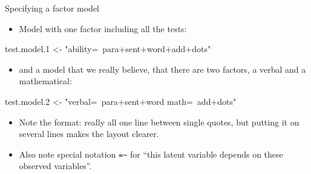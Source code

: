 \documentclass[ignorenonframetext,]{beamer}
\newenvironment{Shaded}{\begin{snugshade}}{\end{snugshade}}
\newcommand{\FloatTok}[1]{\textcolor[rgb]{0.00,0.00,0.81}{#1}}
\newcommand{\NormalTok}[1]{#1}
\newcommand{\StringTok}[1]{\textcolor[rgb]{0.31,0.60,0.02}{#1}}
\providecommand{\tightlist}{%
  \setlength{\itemsep}{0pt}\setlength{\parskip}{0pt}}
\begin{document}
\begin{frame}[fragile]{Specifying a factor model}
\protect\hypertarget{specifying-a-factor-model}{}

\begin{itemize}
\tightlist
\item
  Model with one factor including all the tests:
\end{itemize}

\begin{Shaded}
\begin{Highlighting}[]
\NormalTok{test.model}\FloatTok{.1}\NormalTok{ <-}\StringTok{ "ability=~para+sent+word+add+dots"}
\end{Highlighting}
\end{Shaded}

\begin{itemize}
\tightlist
\item
  and a model that we really believe, that there are two factors, a
  verbal and a mathematical:
\end{itemize}

\begin{Shaded}
\begin{Highlighting}[]
\NormalTok{test.model}\FloatTok{.2}\NormalTok{ <-}\StringTok{ "verbal=~para+sent+word}
\StringTok{                 math=~add+dots"}
\end{Highlighting}
\end{Shaded}

\begin{itemize}
\item
  Note the format: really all one line between single quotes, but
  putting it on several lines makes the layout clearer.
\item
  Also note special notation \texttt{=\textasciitilde{}} for ``this
  latent variable depends on these observed variables''.
\end{itemize}

\end{frame}
\end{document}
